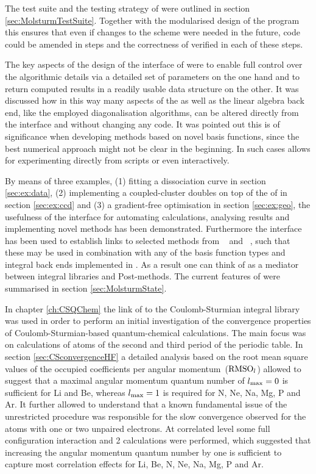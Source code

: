 The test suite and the testing strategy
of \molsturm were outlined in section \ref{sec:MolsturmTestSuite}.
Together with the modularised design of the program
this ensures that even if changes to the \SCF scheme
were needed in the future,
code could be amended in steps
and the correctness of \molsturm verified in each of these steps.

The key aspects of the design of the \python interface of \molsturm
were to enable full control over the algorithmic details
via a detailed set of parameters on the one hand and
to return computed \SCF results in a readily usable data structure on the other.
It was discussed how in this way
many aspects of the \SCF as well as the linear algebra back end,
like the employed diagonalisation algorithms,
can be altered directly from the interface and without changing any code.
It was pointed out this is
of significance when developing methods based on novel basis functions,
since the best numerical approach might not be clear in the beginning.
In such cases \molsturm allows for experimenting
directly from \python scripts or even interactively.

By means of three examples,
(1) fitting a  dissociation curve in section \ref{sec:ex:data},
(2) implementing a coupled-cluster doubles on top of
the \SCF of \molsturm in section \ref{sec:ex:ccd} and
(3) a gradient-free optimisation in section \ref{sec:ex:geo},
the usefulness of the \python interface
for automating calculations,
analysing results
and implementing novel methods has been demonstrated.
Furthermore the \python interface has been used to establish
links to selected methods
from \pyscf~\cite{Sun2017} and \adcman~\cite{Wormit2014},
such that these may be used in combination with any of the
basis function types and integral back ends implemented in \molsturm.
As a result one can think of \molsturm as a mediator
between integral libraries and Post-\HF methods.
The current features of \molsturm
were summarised in section \ref{sec:MolsturmState}.


In chapter \ref{ch:CSQChem} the link of \molsturm
to the Coulomb-Sturmian integral library \sturmint was used
in order to perform an initial investigation
of the convergence properties of Coulomb-Sturmian-based
quantum-chemical calculations.
The main focus was on \HF calculations of atoms
of the second and third period of the periodic table.
In section \ref{sec:CSconvergenceHF}
a detailed analysis based on the root mean square values
of the occupied coefficients per angular momentum~($\text{RMSO}_l$)
allowed to suggest that
a maximal angular momentum quantum number of $l_\text{max} = 0$
is sufficient for Li and Be,
whereas $l_\text{max} = 1$ is required for N, Ne, Na, Mg, P and Ar.
It further allowed to understand that a known fundamental issue of
the unrestricted \HF procedure
was responsible for the slow convergence observed for the
atoms with one or two unpaired electrons.
At correlated level some full configuration interaction and {\MP}2 calculations
were performed,
which suggested that increasing the angular momentum quantum number
by one is sufficient to capture
most correlation effects for Li, Be, N, Ne, Na, Mg, P and Ar.

